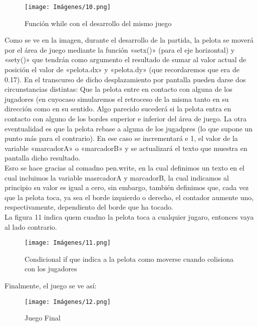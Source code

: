 \documentclass[journal]{IEEEtran}
\begin{document}
\begin{figure}[ht]
    \centering
    \texttt{[image: Imágenes/10.png]}
    \caption{Función while con el desarrollo del mismo juego}
    \label{fig:my_label}
\end{figure}

Como se ve en la imagen, durante el desarrollo de la partida, la pelota se moverá por el área de juego mediante la función «setx()» (para el eje horizontal) y «sety()» que tendrán como argumento el resultado de sumar al valor actual de posición el valor de «pelota.dx» y «pelota.dy» (que recordaremos que era de 0.17). En el transcurso de dicho desplazamiento por pantalla pueden darse dos circunstancias distintas: Que la pelota entre en contacto con alguna de los jugadores (en cuyocaso simularemos el retroceso de la misma tanto en su dirección como en su sentido. Algo parecido sucederá si la pelota entra en contacto con alguno de los bordes superior e inferior del área de juego. La otra eventualidad es que la pelota rebase a alguna de los jugadpres (lo que supone un punto más para el contrario). En ese caso se incrementará e 1, el valor de la variable «marcadorA» o «marcadorB» y se actualizará el texto que muestra en pantalla dicho resultado.\\

Esro se hace gracias al comadno pen.write, en la cual definimos un texto en el cual incluimos la variable masrcadorA y marcadorB, la cual indicamos al principio su valor es igual a cero, sin embargo, también definimos que, cada vez que la pelota toca, ya sea el borde izquierdo o derecho, el contador aumente uno, respectivamente, dependiento del borde que ha tocado.\\

La figura 11 indica quem cuadno la pelota toca a cualquier jugaro, entonces vaya al lado contrario.\\

\begin{figure}[ht]
    \centering
    \texttt{[image: Imágenes/11.png]}
    \caption{Condicional if que indica a la pelota como moverse cuando colisiona con los jugadores}
    \label{fig:my_label}
\end{figure}

Finalmente, el juego se ve así:

\begin{figure}[ht]
    \centering
    \texttt{[image: Imágenes/12.png]}
    \caption{Juego Final}
    \label{fig:my_label}
\end{figure}
\end{document}
